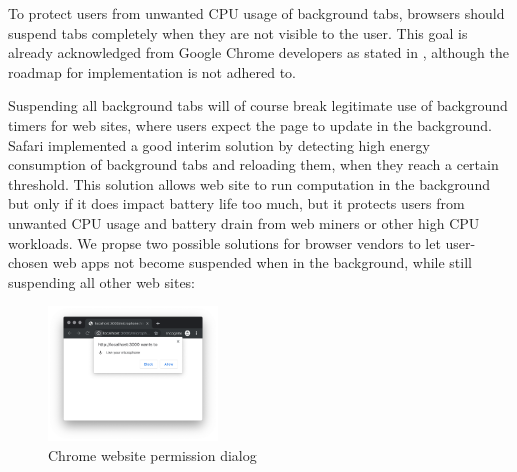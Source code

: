 \documentclass[article,type=bsc,colorback,accentcolor=tud9c]{tudthesis}
\begin{document}
  To protect users from unwanted CPU usage of background tabs, browsers should suspend tabs completely when they are not visible to the user. This goal is already acknowledged from Google Chrome developers as stated in \cite{chrome-background-tabs-roadmap}, although the roadmap for implementation is not adhered to.

  Suspending all background tabs will of course break legitimate use of background timers for web sites, where users expect the page to update in the background. Safari implemented a good interim solution by detecting high energy consumption of background tabs and reloading them, when they reach a certain threshold. This solution allows web site to run computation in the background but only if it does impact battery life too much, but it protects users from unwanted CPU usage and battery drain from web miners or other high CPU workloads. We propse two possible solutions for browser vendors to let user-chosen web apps not become suspended when in the background, while still suspending all other web sites:

  \begin{figure}
    \centering
    \includegraphics[width=0.4\textwidth]{images/microphone-permission.png}
    \caption{Chrome website permission dialog}
    \label{fig:chrome-permission-dialog}
  \end{figure}
\end{document}

